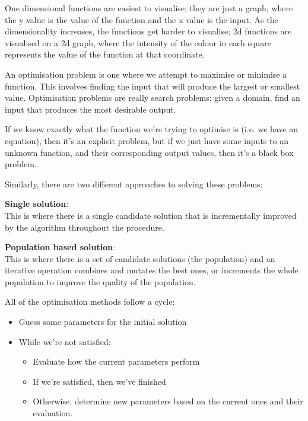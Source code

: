 One dimensional functions are easiest to visualise; they are just a
graph, where the y value is the value of the function and the x value
is the input. As the dimensionality increases, the functions get
harder to visualise; 2d functions are visualised on a 2d graph, where
the intensity of the colour in each square represents the value of the
function at that coordinate.

An optimisation problem is one where we attempt to maximise or minimise a
function. This involves finding the input that will produce the largest or
smallest value. Optimisation problems are really search problems; given a
domain, find an input that produces the most desirable output.

If we know exactly what the function we're trying to optimise is
(i.e. we have an equation), then it's an explicit problem, but if we
just have some inputs to an unknown function, and their corresponding
output values, then it's a black box problem.

Similarly, there are two different approaches to solving these problems:

\begin{description}
  \item \textbf{Single solution}:\\
   This is where there is a single candidate solution that is incrementally 
   improved by the algorithm throughout the procedure.
  \item \textbf{Population based solution}:\\
    This is where there is a set of candidate solutions (the
    population) and an iterative operation combines and mutates the
    best ones, or increments the whole population to improve the
    quality of the population.
\end{description}

All of the optimisation methods follow a cycle:

\begin{itemize}
  \item Guess some parameters for the initial solution
  \item While we're not satisfied:
  \begin{itemize}
    \item Evaluate how the current parameters perform
    \item If we're satisfied, then we've finished
    \item Otherwise, determine new parameters based on the current ones
      and their evaluation.
  \end{itemize}
\end{itemize}

